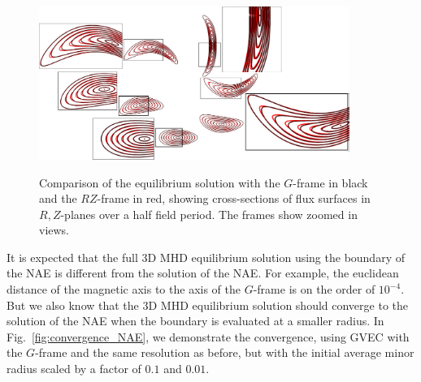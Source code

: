 \documentclass[12pt]{iopart}
\newcommand\GFF{$G$-frame}
\newcommand\RZF{$RZ$-frame}
\newcommand\RZplanes[1]{$R,Z$-planes{#1}}
\begin{document}
\begin{figure}[htbp!]
    \centering
    \includegraphics[width=0.9\textwidth,trim=0 0 0 0,clip]{pics/compare_RZ_planes_N2-12_zoom.png}\\
    \caption{Comparison of the equilibrium solution with the \GFF{} in black and the \RZF{} in red, showing cross-sections of flux surfaces in \RZplanes{ } over a half field period. The frames show zoomed in views.} 
    \label{fig:compare_RZ_planes}  
\end{figure}


It is expected that the full 3D MHD equilibrium solution using the boundary of the NAE is different from the solution of the NAE. For example, the euclidean distance of the magnetic axis to the axis of the \GFF{} is on the order of $10^{-4}$. But we also know that the 3D MHD equilibrium solution should converge to the solution of the NAE when the boundary is evaluated at a smaller radius. In Fig.~\ref{fig:convergence_NAE}, we demonstrate the  convergence, using GVEC with the \GFF{} and the same resolution as before, but with the initial average minor radius scaled by a factor of $0.1$ and $0.01$. 
\end{document}

